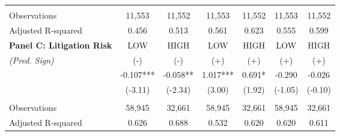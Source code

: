 \begin{table}[H]
\begin{center}
\begin{tabular}{lcccccc}
  		&  &  &  &  &  &  \\
  		\multicolumn{1}{l}{Observations} & 11,553 & 11,552 & 11,553 & 11,552 & 11,553 & 11,552 \\
  		\multicolumn{1}{l}{Adjusted R-squared} & 0.456 & 0.513 & 0.561 & 0.623 & 0.555 & 0.599 \\
  		\midrule
  		\multicolumn{1}{l}{\textbf{Panel C: Litigation Risk}} & LOW & HIGH & LOW & HIGH & LOW & HIGH \\
  		\cmidrule{2-7}
  		\rowcolor[rgb]{ .933,  .925,  .882} \textit{(Pred. Sign)} & (-) & (-) & (+) & (+) & (+) & (+) \\
  		\rowcolor[rgb]{ .933,  .925,  .882} \multicolumn{1}{l}{QRET$\times$NEG} & -0.107*** & -0.058** & 1.017*** & 0.691* & -0.290 & -0.026 \\
  		\rowcolor[rgb]{ .933,  .925,  .882} \multicolumn{1}{l}{} & (-3.11) & (-2.34) & (3.00) & (1.92) & (-1.05) & (-0.10) \\
  		&  &  &  &  &  &  \\
  		Observations & 58,945 & 32,661 & 58,945 & 32,661 & 58,945 & 32,661 \\
  		Adjusted R-squared & 0.626 & 0.688 & 0.532 & 0.620 & 0.620 & 0.611 \\
  		

\end{tabular}
\end{center}
\end{table}
